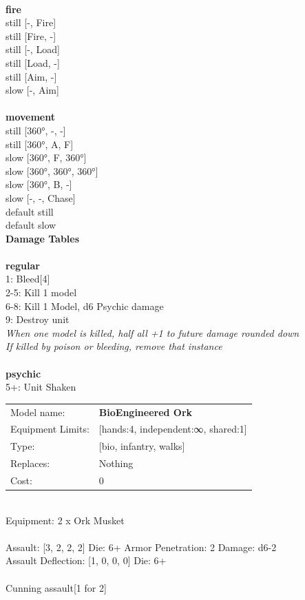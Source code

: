 \noindent 

\ \\ {\bf fire } \\
still [-, Fire] \\
still [Fire, -] \\
still [-, Load] \\
still [Load, -] \\
still [Aim, -] \\
slow [-, Aim] \\
\ \\ {\bf movement } \\
still [360°, -, -] \\
still [360°, A, F] \\
slow [360°, F, 360°] \\
slow [360°, 360°, 360°] \\
slow [360°, B, -] \\
slow [-, -, Chase] \\
default still \\
default slow \\


{\bf Damage Tables} \\
\ \\ {\bf regular } \\
1: Bleed[4] \\
2-5: Kill 1 model \\
6-8: Kill 1 Model, d6 Psychic damage \\
9: Destroy unit \\
{{\it When one model is killed, half all +1 to future damage rounded down}} \\
{{\it If killed by poison or bleeding, remove that instance}} \\
\ \\ {\bf psychic } \\
5+: Unit Shaken \\


\noindent
\begin{tabular}{ll}
Model name: &{\bf BioEngineered Ork } \\
Equipment Limits: &[hands:4, independent:∞, shared:1] \\
Type: &[bio, infantry, walks] \\
Replaces: &Nothing \\
Cost: & 0\\
\end{tabular}
\ \\
Equipment: 2 x Ork Musket \\
\ \\
Assault: [3, 2, 2, 2] Die: 6+ Armor Penetration: 2 Damage: d6-2 \\
Assault Deflection: [1, 0, 0, 0] Die: 6+\\
\\ 
Cunning assault[1 for 2]\\ 
 
